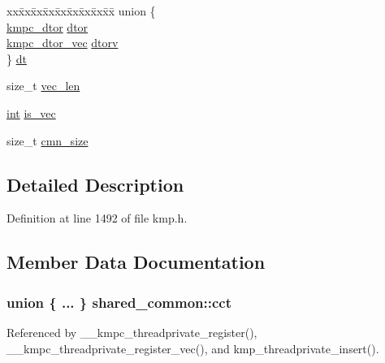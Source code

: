 \begin{DoxyCompactItemize}
\begin{tabbing}
\end{tabbing}\item 
\begin{tabbing}
xx\=xx\=xx\=xx\=xx\=xx\=xx\=xx\=xx\=\kill
union \{\\
\>\hyperlink{group__THREADPRIVATE_gad8268ac7d007fa1c3351da682c487c0f}{kmpc\_dtor} \hyperlink{structshared__common_a127171cc49794904b593bee96f1b7d04}{dtor}\\
\>\hyperlink{group__THREADPRIVATE_gab7035b42d465074b31195534efb37e3b}{kmpc\_dtor\_vec} \hyperlink{structshared__common_a010d4cfee51a4eef6f53edb1dd7be918}{dtorv}\\
\} \hyperlink{structshared__common_ae1c3740671335275599c29df1f6d71d1}{dt}\\

\end{tabbing}\item 
size\-\_\-t \hyperlink{structshared__common_ae2761da4a704f4f2f377854538ba153c}{vec\-\_\-len}
\item 
\hyperlink{ittnotify__static_8h_a8b8dcd723308a8cb5d84277c7a3fff70}{int} \hyperlink{structshared__common_affe99e67b32f42b3bae07c95c59d8f24}{is\-\_\-vec}
\item 
size\-\_\-t \hyperlink{structshared__common_acd7343a82a2dd92f8b7a78eab8429b72}{cmn\-\_\-size}
\end{DoxyCompactItemize}


\subsection{Detailed Description}


Definition at line 1492 of file kmp.\-h.



\subsection{Member Data Documentation}
\hypertarget{structshared__common_a3292a73e5a3070dfdb448f7b205f68a5}{
\subsubsection[{cct}]{\setlength{\rightskip}{0pt plus 5cm}union \{ ... \}   shared\-\_\-common\-::cct}}\label{structshared__common_a3292a73e5a3070dfdb448f7b205f68a5}


Referenced by \-\_\-\-\_\-kmpc\-\_\-threadprivate\-\_\-register(), \-\_\-\-\_\-kmpc\-\_\-threadprivate\-\_\-register\-\_\-vec(), and kmp\-\_\-threadprivate\-\_\-insert().

